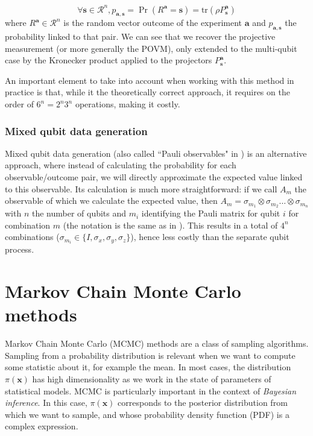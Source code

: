 \documentclass[12pt]{memoir}
\newcommand{\tr}{\text{tr}}
\newcommand{\mb}{\mathbf}
\newcommand{\ti}{\textit}
\begin{document}
\begin{equation}
    \forall \mb s \in \mathcal{R}^n, p_{\mb a,\mb s} = \Pr(R^{\mb a} = \mb s) = \tr(\rho P^{\mb a}_{\mb s})
\end{equation}
where $R^\mb{a} \in \mathcal{R}^n$ is the random vector outcome of the experiment $\mb a$ and $p_{\mb a,\mb s}$ the probability linked to that pair. We can see that we recover the projective measurement (or more generally the POVM), only extended to the multi-qubit case by the Kronecker product applied to the projectors $P^{\mb a}_\mb{ s}$.\medbreak

An important element to take into account when working with this method in practice is that, while it the theoretically correct approach, it requires on the order of $6^n = 2^n 3^n$ operations, making it costly.



\subsubsection*{Mixed qubit data generation}\label{section:mixed-qub-dg}

Mixed qubit data generation (also called ``Pauli observables" in \cite{Guta20}) is an alternative approach, where instead of calculating the probability for each observable/outcome pair, we will directly approximate the expected value linked to this observable. Its calculation is much more straightforward: if we call $A_m$ the observable of which we calculate the expected value, then $A_m = \sigma_{m_1} \otimes \sigma_{m_2} \dots \otimes \sigma_{m_n}$ with $n$ the number of qubits and $m_i$ identifying the Pauli matrix for qubit $i$ for combination $m$ (the notation is the same as in \cite{meth:bayesian:Langevin:ACMT2024}). This results in a total of $4^n$ combinations ($\sigma_{m_i} \in \{I, \sigma_x, \sigma_y, \sigma_z\}$), hence less costly than the separate qubit process.

\newpage

\section{Markov Chain Monte Carlo methods}
Markov Chain Monte Carlo (MCMC) methods are a class of sampling algorithms. Sampling from a probability distribution is relevant when we want to compute some statistic about it, for example the mean. In most cases, the distribution $\pi(\mb x)$ has high dimensionality as we work in the state of parameters of statistical models. MCMC is particularly important in the context of \ti{Bayesian inference}. In this case, $\pi(\mb x)$ corresponds to the posterior distribution from which we want to sample, and whose probability density function (PDF) is a complex expression. \medbreak
\end{document}
